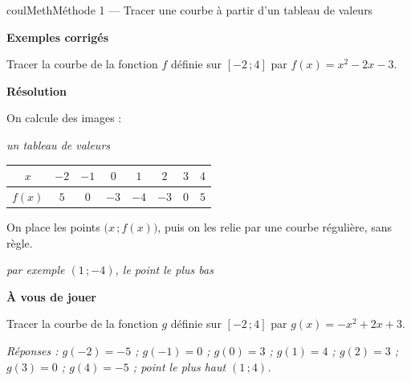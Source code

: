 \documentclass[11pt,a4paper]{article}
\makeatletter
\newcommand{\lycee@repere}[4]{%
  \draw[grille,step=1] (#1,#2) grid (#3,#4);
  \draw[-{Stealth[length=2mm]},thick] (#1,0)--({#3+0.4},0) node[below left=-1pt]{$x$};
  \draw[-{Stealth[length=2mm]},thick] (0,#2)--(0,{#4+0.4}) node[below left=-1pt]{$y$};
  \node[below left,font=\scriptsize,inner sep=1.5pt] at (0,0) {$0$};}
\newcommand{\lycee@gradx}[1]{\foreach \k/\l in {#1}{%
  \draw (\k,0.07)--(\k,-0.07) node[below,font=\scriptsize,inner sep=1.5pt]{$\l$};}}
\newcommand{\lycee@grady}[1]{\foreach \k/\l in {#1}{%
  \draw (0.07,\k)--(-0.07,\k) node[left,font=\scriptsize,inner sep=1.5pt]{$\l$};}}
\newcommand{\lycee@intff}[2]{\left[#1\,;#2\right]}
\providecommand{\repere}{\lycee@repere}%
\providecommand{\gradx}{\lycee@gradx}%
\providecommand{\grady}{\lycee@grady}%
\providecommand{\Cf}{\mathcal{C}\sb{f}}%
\providecommand{\intff}{\lycee@intff}%
\newcounter{lycee@signet}
\newcommand{\signet}[3][]{\stepcounter{lycee@signet}%
  \edef\lycee@dest{\if\relax\detokenize{#1}\relax
    signet.\arabic{lycee@signet}\else#1\fi}%
  \hypertarget{\lycee@dest}{}\bookmark[level=#2,dest=\lycee@dest]{#3}}
\newcounter{methode}
\newenvironment{methodebox}[1][Méthode]{\stepcounter{methode}%
  \begin{boitecours}[phantom={\signet[methode-\arabic{methode}]{2}{#1}}]{coulMeth}{#1}}%
  {\end{boitecours}}
\newcommand{\etape}[1]{\par\smallskip\textbf{\color{coulMeth}#1}\par\nobreak\smallskip}
\newcommand{\reponse}[1]{\par\smallskip
  {\footnotesize\itshape\color{black!55}Réponses : #1}}
\newcommand{\explique}[2]{\par\smallskip\noindent
  \begin{minipage}[t]{0.57\linewidth}\raggedright #1\end{minipage}\hfill
  \begin{minipage}[t]{0.40\linewidth}\raggedright\leavevmode
    {\small\itshape\color{black!60}#2}\end{minipage}\par}
\newcommand{\cas}[1]{\par\smallskip\noindent\textbf{\color{coulExo}#1}\vadjust{\nobreak}}
\newenvironment{correction}{\par}{\par}
\newcommand{\etapeexemples}{\etape{Exemples corrigés}}
\makeatother
\begin{document}
\begin{methodebox}[Méthode 1 --- Tracer une courbe à partir d'un tableau de valeurs]
\etapeexemples
Tracer la courbe de la fonction $f$ définie sur $\intff{-2}{4}$ par $f(x)=x^{2}-2x-3$.
\begin{correction}
\cas{Résolution}\par\nopagebreak
\begin{minipage}[c]{0.58\linewidth}\raggedright
\explique{On calcule des images :}{un tableau de valeurs}
\begin{center}\small
\renewcommand{\arraystretch}{1.25}
\begin{tabular}{|c|c|c|c|c|c|c|c|}
\hline
$x$ & $-2$ & $-1$ & $0$ & $1$ & $2$ & $3$ & $4$\\
\hline
$f(x)$ & $5$ & $0$ & $-3$ & $-4$ & $-3$ & $0$ & $5$\\
\hline
\end{tabular}
\end{center}
\explique{On place les points $\bigl(x\,;f(x)\bigr)$, puis on les relie par une courbe
régulière, sans règle.}{par exemple $(1\,;-4)$, le point le plus bas}
\end{minipage}\hfill
\begin{minipage}[c]{0.38\linewidth}\centering
{}
\end{minipage}
\end{correction}

\etape{À vous de jouer}
Tracer la courbe de la fonction $g$ définie sur $\intff{-2}{4}$ par $g(x)=-x^{2}+2x+3$.
\reponse{$g(-2)=-5$ ;\; $g(-1)=0$ ;\; $g(0)=3$ ;\; $g(1)=4$ ;\; $g(2)=3$ ;\;
$g(3)=0$ ;\; $g(4)=-5$ ;\; point le plus haut $(1\,;4)$.}
\end{methodebox}
\end{document}
